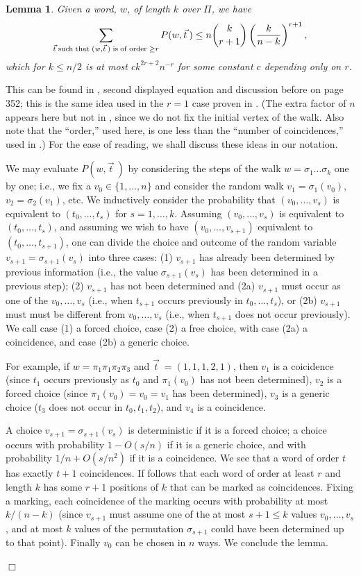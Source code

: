 \documentclass[12pt]{article}
\newtheorem{lemma}[theorem]{Lemma}
\newcommand{\intn}{{\{1,\ldots,n\}}}
\newcommand{\proof}{{\par\noindent {\bf Proof}\space\space}}
\newcommand{\proofbox}{\begin{flushright}$\Box$\end{flushright}}
\begin{document}
\begin{lemma}\label{lm:big_order}
Given a word, $w$, of length $k$ over $\Pi$, we have
$$
\sum_{\vec t\;{\rm such\;that}\;(w,\vec t\>)\;{\rm is\;of\;order} \; \ge r} 
P(w,\vec t\>)
\le n\binom{k}{r+1}\left(\frac{k}{n-k}\right)^{r+1},
$$
which for $k\le n/2$ is at most $ck^{2r+2}n^{-r}$ for some constant $c$
depending only on $r$.
\end{lemma}
\proof 
This can be found in
\cite{friedman_random_graphs}, second displayed equation and
discussion before on page 352; this is the same idea used in the $r=1$
case proven in \cite{broder}.  (The extra factor of $n$ appears here
but not in \cite{friedman_random_graphs}, since
we do not fix the initial vertex of the walk.  Also note that the ``order,''
used here, is one less than the ``number of coincidences,''
used in \cite{friedman_random_graphs}.)  For the ease of reading, we shall
discuss these ideas in our notation.

We may evaluate $P(w,\vec t\>)$ by considering the steps of the walk
$w=\sigma_1\ldots\sigma_k$ one by one; i.e., we fix a $v_0\in\intn$
and consider the random walk $v_1=\sigma_1(v_0)$, $v_2=\sigma_2(v_1)$,
etc.  We inductively consider the probability that $(v_0,\ldots,v_s)$
is equivalent to $(t_0,\ldots,t_s)$ for $s=1,\ldots,k$.
Assuming $(v_0,\ldots,v_s)$
is equivalent to $(t_0,\ldots,t_s)$, and assuming we wish to have
$(v_0,\ldots,v_{s+1})$
equivalent to $(t_0,\ldots,t_{s+1})$,
one can divide the choice and outcome
of the random variable $v_{s+1}=\sigma_{s+1}(v_s)$ into three cases:
(1) $v_{s+1}$ has already been determined by previous information
(i.e., the value $\sigma_{s+1}(v_s)$ has been determined in a previous
step); 
(2) $v_{s+1}$ has not been determined and
(2a) $v_{s+1}$ must occur as one of the $v_0,\ldots,v_s$
(i.e., when $t_{s+1}$ occurs previously
in $t_0,\ldots,t_s$), or (2b) $v_{s+1}$ must
must be different from $v_0,\ldots,v_s$ (i.e., when $t_{s+1}$ does
not occur previously).
We call case (1) a forced choice, case (2)
a free choice, with case (2a) a coincidence, and case (2b) a generic
choice.

For example, if $w=\pi_1\pi_1\pi_2\pi_3$ and $\vec t\> = (1,1,1,2,1)$,
then $v_1$ is a coicidence (since $t_1$ occurs previously as $t_0$ and
$\pi_1(v_0)$ has not been determined), $v_2$ is
a forced choice (since $\pi_1(v_0)=v_0=v_1$ has been determined),
$v_3$ is a generic choice ($t_3$ does not occur in $t_0,t_1,t_2$),
and $v_4$ is a coincidence.

A choice $v_{s+1}=\sigma_{s+1}(v_s)$ is deterministic if it is a forced
choice;  a choice occurs with probability $1 - O(s/n)$ if it is
a generic choice, and with probability $1/n + O(s/n^2)$ if it is a 
coincidence.
We see that a word of order $t$ has exactly $t+1$ coincidences.
If follows that each word of order at least $r$ and length $k$ has some
$r+1$ positions of $k$ that can be marked as coincidences.  Fixing a 
marking, each coincidence of the marking occurs with probability
at most $k/(n-k)$ (since $v_{s+1}$ must assume one of the at most
$s+1\le k$ values
$v_0,\ldots,v_s$, and at most $k$ values of the permutation $\sigma_{s+1}$
could have been determined up to that point).  
Finally $v_0$ can be chosen in $n$ ways.  We conclude
the lemma.
\proofbox
\end{document}
